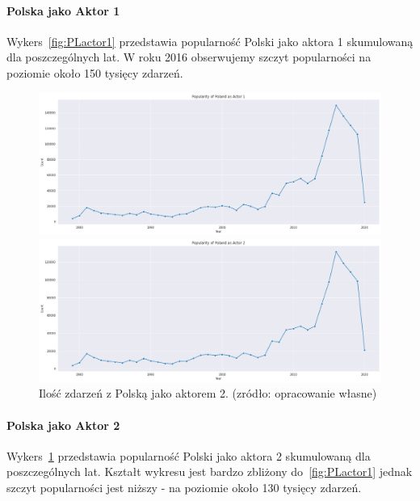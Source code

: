 \documentclass[11pt]{report}
\begin{document}
    \paragraph{Polska jako Aktor 1}
    Wykers~\ref{fig:PLactor1} przedstawia popularność Polski jako aktora 1 skumulowaną dla poszczególnych lat. W roku 2016 obserwujemy szczyt popularności na poziomie około 150 tysięcy zdarzeń.
    \begin{figure}[ht]
        \centering
        \includegraphics[width=1 \textwidth]{fig/PL/PLactor1.png}
        \caption{Ilość zdarzeń z Polską jako aktorem 1. (zródło: opracowanie własne)}
        \label{fig:PLactor1}
        \includegraphics[width=1 \textwidth]{fig/PL/PLactor2.png}
        \caption{Ilość zdarzeń z Polską jako aktorem 2. (zródło: opracowanie własne)}
        \label{fig:PLactor2}
    \end{figure}

    \paragraph{Polska jako Aktor 2}
    Wykers~\ref{fig:PLactor2} przedstawia popularność Polski jako aktora 2 skumulowaną dla poszczególnych lat. Kształt wykresu jest bardzo zbliżony do~\ref{fig:PLactor1} jednak szczyt popularności jest niższy - na poziomie około 130 tysięcy zdarzeń.
\end{document}
